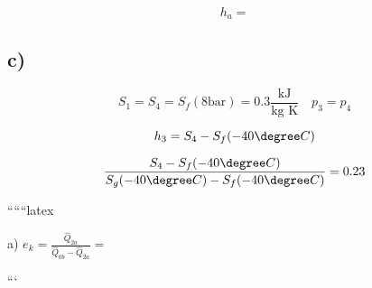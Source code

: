 \[
h_a =
\]

\subsection*{c)}

\[
S_1 = S_4 = S_f (8 \text{bar}) = 0.3 \frac{\text{kJ}}{\text{kg K}} \quad p_3 = p_4
\]

\[
h_3 = S_4 - S_f (-40\degree C)
\]

\[
\frac{S_4 - S_f (-40\degree C)}{S_g (-40\degree C) - S_f (-40\degree C)} = 0.23
\]

``````latex


a) \( e_k = \frac{\hat{Q}_{2a}}{\hat{Q}_{0b} - \hat{Q}_{2a}} = \)

```